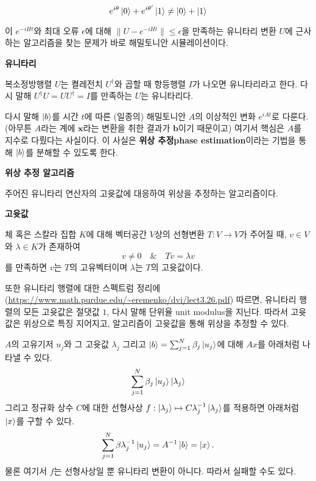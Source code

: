 \documentclass[a4paper,atbegshi,chapter]{oblivoir}
\begin{document}
\begin{mdframed}
\begin{mdframed}
\begin{mdframed}
      \[
        e^{i\theta}\ket0+e^{i\theta'}\ket1 \neq \ket0+\ket1
      \]
    \end{mdframed}
  \end{mdframed}
  이 $e^{-iHt}$와
  최대 오류 $\epsilon$에 대해 $\|U-e^{-iHt}\|\leq\epsilon$을 만족하는
  유니타리 변환 $U$에 근사하는 알고리즘을 찾는 문제가 바로 해밀토니안
  시뮬레이션이다.
  \begin{mdframed}
    \begin{center}\textbf{유니타리}\end{center}
    \noindent 복소정방행렬 $U$는 켤레전치 $U^{\dagger}$와 곱할 때 항등행렬
    $I$가 나오면 유니타리라고 한다. 다시 말해 $U^{\dagger}U=UU^{\dagger}=I$를
    만족하는 $U$는 유니타리다.
  \end{mdframed}
\end{mdframed}
다시 말해 $\ket{b}$를 시간 $t$에 따른 (일종의) 해밀토니안 $A$의 이상적인 변화
$e^{iAt}$로 다룬다. (아무튼 $A$라는 계에 $\mathbf{x}$라는 변환을 취한 결과가 
$\mathbf{b}$이기 때문이고) 여기서 핵심은 $A$를 지수로 다뤘다는 사실이다.
이 사실은 \textbf{위상 추정\footnotesize phase estimation}이라는 기법을 통해
$\ket{b}$를 분해할 수 있도록 한다.
\begin{mdframed}
  \begin{center}\textbf{위상 추정 알고리즘}\end{center}
  \noindent 주어진 유니타리 연산자의 고윳값에 대응하여 위상을 추정하는
  알고리즘이다. 
  \begin{mdframed}
    \begin{center}\textbf{고윳값}\end{center}
    \noindent 체 혹은 스칼라 집합 $K$에 대해 벡터공간 $V$상의 선형변환
    $T:V\rightarrow V$가 주어질 때, $v\in V$와 $\lambda\in K$가 존재하여
    \[
      v\neq 0\quad\&\quad Tv=\lambda v
    \]
    를 만족하면 $v$는 $T$의 고유벡터이며 $\lambda$는 $T$의 고윳값이다.
  \end{mdframed}
  또한 유니타리 행렬에 대한 스펙트럼 정리에 (\url{https://www.math.purdue.edu/~eremenko/dvi/lect3.26.pdf}) 
  따르면, 유니타리 행렬의 모든 고윳값은 절댓값 $1$, 다시 말해 단위율{\footnotesize
  unit modulus}을 지닌다. 따라서 고윳값은 위상으로 특징 지어지고, 알고리즘이
  고윳값을 통해 위상을 추정할 수 있다.
\end{mdframed}
$A$의 고유기저 $u_j$와 그 고윳값 $\lambda_j$ 그리고 $\ket{b}=
\sum_{j=1}^N\beta_j\ket{u_j}$에 대해 $Ax$를 아래처럼 나타낼 수 있다.
\[
  \sum_{j=1}^N\beta_j\ket{u_j}\ket{\lambda_j}
\]
그리고 정규화 상수 $C$에 대한 선형사상 
$f:\ket{\lambda_j}\mapsto C\lambda_j^{-1}\ket{\lambda_j}$를 적용하면 아래처럼
$\ket{x}$를 구할 수 있다.
\[
  \sum_{j=1}^N\beta\lambda_j^{-1}\ket{u_j}=A^{-1}\ket{b}=\ket{x}.
\]
물론 여기서 $f$는 선형사상일 뿐 유니타리 변환이 아니다. 따라서 실패할 수도 있다.
\end{document}
